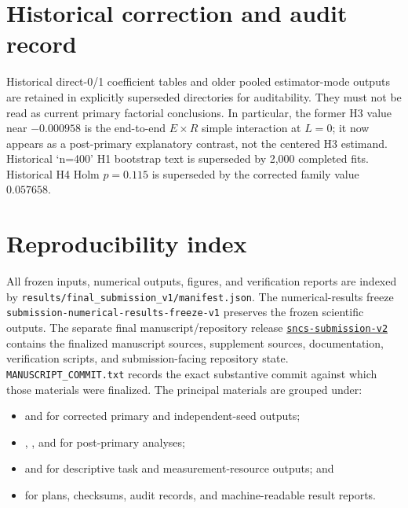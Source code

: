 \documentclass[pdflatex,sn-basic,Numbered]{sn-jnl}
\begin{document}
\section{Historical correction and audit record}

Historical direct-0/1 coefficient tables and older pooled estimator-mode outputs are retained in explicitly superseded directories for auditability. They must not be read as current primary factorial conclusions. In particular, the former H3 value near $-0.000958$ is the end-to-end $E\times R$ simple interaction at $L=0$; it now appears as a post-primary explanatory contrast, not the centered H3 estimand. Historical `n=400' H1 bootstrap text is superseded by 2,000 completed fits. Historical H4 Holm $p=0.115$ is superseded by the corrected family value $0.057658$.

\section{Reproducibility index}

All frozen inputs, numerical outputs, figures, and verification reports are indexed by
\texttt{results/final\_submission\_v1/manifest.json}. The numerical-results freeze
\nolinkurl{submission-numerical-results-freeze-v1} preserves the frozen scientific outputs. The separate final manuscript/repository release
\href{https://github.com/Brandon-Shen/few-qubit-qnn-snr/tree/sncs-submission-v2}{\texttt{sncs-submission-v2}}
contains the finalized manuscript sources, supplement sources, documentation, verification scripts, and submission-facing repository state. \texttt{MANUSCRIPT\_COMMIT.txt} records the exact substantive commit against which those materials were finalized. The principal materials are grouped under:
\begin{itemize}
\item {} and  for corrected primary and independent-seed outputs;
\item {}, , and  for post-primary analyses;
\item {} and  for descriptive task and measurement-resource outputs; and
\item {} for plans, checksums, audit records, and machine-readable result reports.
\end{itemize}
\end{document}

